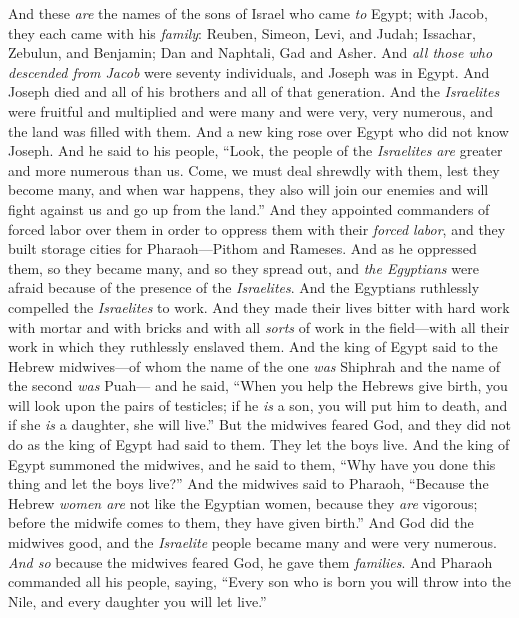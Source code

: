 
\begin{biblechapter} %
 And these \textit{are} the names of the sons of Israel who came \textit{to} Egypt; with Jacob, they each came with his \textit{family}:
\verse Reuben, Simeon, Levi, and Judah;
\verse Issachar, Zebulun, and Benjamin;
\verse Dan and Naphtali, Gad and Asher.
\verse And \textit{all those who descended from Jacob} were seventy individuals, and Joseph was in Egypt.
\verse And Joseph died and all of his brothers and all of that generation.
\verse And the \textit{Israelites} were fruitful and multiplied and were many and were very, very numerous, and the land was filled with them.
\verse And a new king rose over Egypt who did not know Joseph.
\verse And he said to his people, “Look, the people of the \textit{Israelites} \textit{are} greater and more numerous than us.
\verse Come, we must deal shrewdly with them, lest they become many, and when war happens, they also will join our enemies and will fight against us and go up from the land.”
\verse And they appointed commanders of forced labor over them in order to oppress them with their \textit{forced labor}, and they built storage cities for Pharaoh—Pithom and Rameses.
\verse And as he oppressed them, so they became many, and so they spread out, and \textit{the Egyptians} were afraid because of the presence of the \textit{Israelites}.
\verse And the Egyptians ruthlessly compelled the \textit{Israelites} to work.
\verse And they made their lives bitter with hard work with mortar and with bricks and with all \textit{sorts} of work in the field—with all their work in which they ruthlessly enslaved them.
\verse And the king of Egypt said to the Hebrew midwives—of whom the name of the one \textit{was} Shiphrah and the name of the second \textit{was} Puah—
\verse and he said, “When you help the Hebrews give birth, you will look upon the pairs of testicles; if he \textit{is} a son, you will put him to death, and if she \textit{is} a daughter, she will live.”
\verse But the midwives feared God, and they did not do as the king of Egypt had said to them. They let the boys live.
\verse And the king of Egypt summoned the midwives, and he said to them, “Why have you done this thing and let the boys live?”
\verse And the midwives said to Pharaoh, “Because the Hebrew \textit{women are} not like the Egyptian women, because they \textit{are} vigorous; before the midwife comes to them, they have given birth.”
\verse And God did the midwives good, and the \textit{Israelite} people became many and were very numerous.
\verse \textit{And so} because the midwives feared God, he gave them \textit{families}.
\verse And Pharaoh commanded all his people, saying, “Every son who is born you will throw into the Nile, and every daughter you will let live.”
\end{biblechapter}

